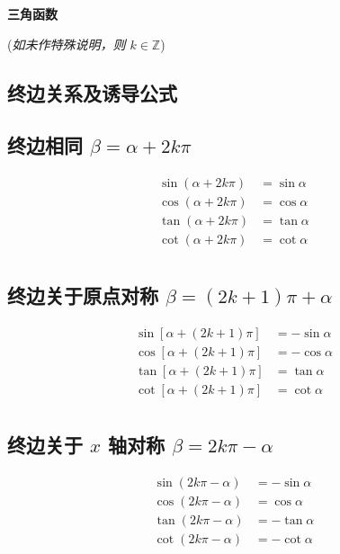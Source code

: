 \documentclass[a4paper, fleqn]{ctexart}
\newcommand{\diform}{\noindent}
\begin{document}
	\begin{center}
		\textbf{\LARGE 三角函数} \par
		(\emph{如未作特殊说明，则 $k \in \mathbb{Z}$})
	\end{center}

	\begin{multicols}{2}
		\section{终边关系及诱导公式}
		\subsection{终边相同 $\beta = \alpha + 2k\pi$}
		\diform
		\begin{align*}
		\sin\left(\alpha+2k\pi\right)&=\sin\alpha \\
		\cos\left(\alpha+2k\pi\right)&=\cos\alpha \\
		\tan\left(\alpha+2k\pi\right)&=\tan\alpha \\
		\cot\left(\alpha+2k\pi\right)&=\cot\alpha \\
		\end{align*}
		
		\subsection{终边关于原点对称 $\beta = (2k+1)\pi+\alpha$}
		\diform
		\begin{align*}
		\sin\left[\alpha+\left(2k+1\right)\pi\right]&=-\sin\alpha \\
		\cos\left[\alpha+\left(2k+1\right)\pi\right]&=-\cos\alpha \\
		\tan\left[\alpha+\left(2k+1\right)\pi\right]&=\tan\alpha \\
		\cot\left[\alpha+\left(2k+1\right)\pi\right]&=\cot\alpha \\
		\end{align*}
		
		
		\subsection{终边关于 $ x $ 轴对称 $\beta = 2k \pi - \alpha$}
		\diform
		\begin{align*}
		\sin\left(2k\pi-\alpha\right)&=-\sin\alpha \\
		\cos\left(2k\pi-\alpha\right)&=\cos\alpha \\
		\tan\left(2k\pi-\alpha\right)&=-\tan\alpha \\
		\cot\left(2k\pi-\alpha\right)&=-\cot\alpha \\
		\end{align*}
		

\end{multicols}
\end{document}
